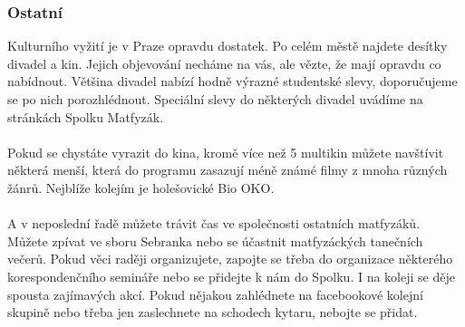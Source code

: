 \subsubsection{Ostatní}
Kulturního vyžití je v Praze opravdu dostatek. Po celém městě najdete desítky
divadel a kin. Jejich objevování necháme na vás, ale vězte, že mají opravdu co
nabídnout. Většina divadel nabízí hodně výrazné studentské slevy, doporučujeme
se po nich porozhlédnout. Speciální slevy do některých divadel uvádíme na
stránkách Spolku Matfyzák.
\\\\
Pokud se chystáte vyrazit do kina, kromě více než 5 multikin můžete navštívit
některá menší, která do programu zasazují méně známé filmy z mnoha různých
žánrů. Nejblíže kolejím je holešovické Bio OKO.
\\\\
A v neposlední řadě můžete trávit čas ve společnosti ostatních matfyzáků. Můžete
zpívat ve sboru Sebranka nebo se účastnit matfyzáckých tanečních večerů. Pokud
věci raději organizujete, zapojte se třeba do organizace některého
korespondenčního semináře nebo se přidejte k nám do Spolku. I na koleji se děje
spousta zajímavých akcí. Pokud nějakou zahlédnete na facebookové kolejní skupině
nebo třeba jen zaslechnete na schodech kytaru, nebojte se přidat.